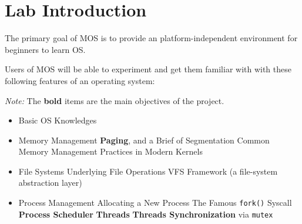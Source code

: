 \chapter*{Lab Introduction}

The primary goal of MOS is to provide an platform-independent environment for beginners to learn OS.

Users of MOS will be able to experiment and get them familiar with with these following features
of an operating system:

\textit{Note:} The \textbf{bold} items are the main objectives of the project.

\begin{itemize}
    \item Basic OS Knowledges
    \item Memory Management
          \subitem \textbf{Paging}, and a Brief of Segmentation
          \subitem Common Memory Management Practices in Modern Kernels
    \item File Systems
          \subitem Underlying File Operations
          \subitem VFS Framework (a file-system abstraction layer)
    \item Process Management
          \subitem Allocating a New Process
          \subitem The Famous \texttt{fork()} Syscall
          \subitem \textbf{Process Scheduler}
          \subitem \textbf{Threads}
          \subitem \textbf{Threads Synchronization} via \texttt{mutex}
\end{itemize}
